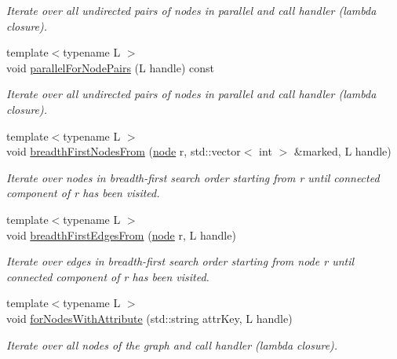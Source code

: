 \begin{DoxyCompactItemize}
\begin{DoxyCompactList}\small\item\em Iterate over all undirected pairs of nodes in parallel and call handler (lambda closure). \end{DoxyCompactList}\item 
{\footnotesize template$<$typename L $>$ }\\void \hyperlink{class_networ_kit_1_1_graph_afc68ceae56467a28d722a117f00bf50f}{parallel\-For\-Node\-Pairs} (L handle) const 
\begin{DoxyCompactList}\small\item\em Iterate over all undirected pairs of nodes in parallel and call handler (lambda closure). \end{DoxyCompactList}\item 
{\footnotesize template$<$typename L $>$ }\\void \hyperlink{class_networ_kit_1_1_graph_a02659fe2c37176f0fdb3c2a5099c75cf}{breadth\-First\-Nodes\-From} (\hyperlink{namespace_networ_kit_a61914158fd771265be48de9942369160}{node} r, std\-::vector$<$ int $>$ \&marked, L handle)
\begin{DoxyCompactList}\small\item\em Iterate over nodes in breadth-\/first search order starting from r until connected component of r has been visited. \end{DoxyCompactList}\item 
{\footnotesize template$<$typename L $>$ }\\void \hyperlink{class_networ_kit_1_1_graph_a571265128780839333214b2d14d15e1b}{breadth\-First\-Edges\-From} (\hyperlink{namespace_networ_kit_a61914158fd771265be48de9942369160}{node} r, L handle)
\begin{DoxyCompactList}\small\item\em Iterate over edges in breadth-\/first search order starting from node r until connected component of r has been visited. \end{DoxyCompactList}\item 
{\footnotesize template$<$typename L $>$ }\\void \hyperlink{class_networ_kit_1_1_graph_ae182c231c108a4ff329f79e4eec28bc6}{for\-Nodes\-With\-Attribute} (std\-::string attr\-Key, L handle)
\begin{DoxyCompactList}\small\item\em Iterate over all nodes of the graph and call handler (lambda closure). \end{DoxyCompactList}\item 

\end{DoxyCompactItemize}
